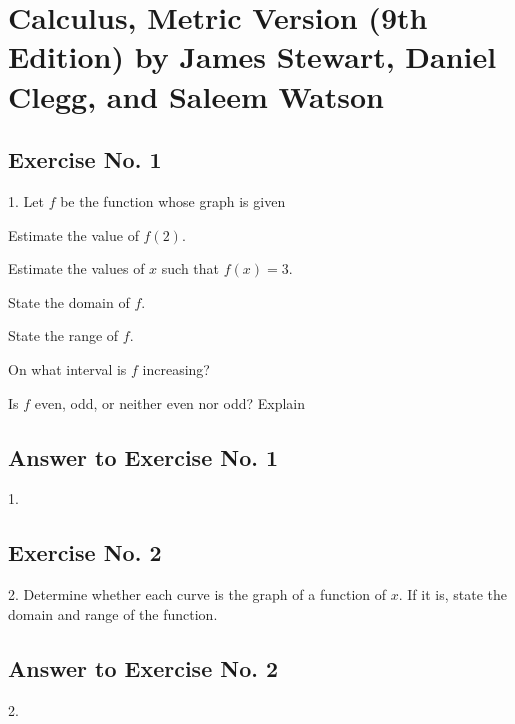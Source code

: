 \documentclass[oneside, 11pt, DIV = 10, BCOR = 0mm, headsepline = 0.8pt, footsepline = 0.4pt, numbers = noenddot, headings = openany]{scrbook}
\date{}
\title{}
\begin{document}
\onehalfspacing
\recalctypearea
\mainmatter
\part*{Calculus, Metric Version (9th Edition) by James Stewart, Daniel Clegg, and Saleem Watson}
\label{sec:orgad5dfad}
\chapter*{Exercise No. 1}
\label{sec:orgf73563b}
\begin{EnumerateQuestions}
\item[1.] Let \(f\) be the function whose graph is given
  \begin{EnumerateSubquestions}
    \item Estimate the value of \(f(2)\).
    \item Estimate the values of \(x\) such that \(f(x) = 3\).
    \item State the domain of \(f\).
    \item State the range of \(f\).
    \item On what interval is \(f\) increasing?
    \item Is \(f\) even, odd, or neither even nor odd? Explain
  \end{EnumerateSubquestions}
\end{EnumerateQuestions}
\chapter*{Answer to Exercise No. 1}
\label{sec:orgf557ac2}
\begin{EnumerateQuestions}
  \item[1.]
\end{EnumerateQuestions}
\chapter*{Exercise No. 2}
\label{sec:org69b4bb9}
\begin{EnumerateQuestions}
  \item[2.] Determine whether each curve is the graph of a function of \(x\).
     If it is, state the domain and range of the function.
\end{EnumerateQuestions}
\chapter*{Answer to Exercise No. 2}
\label{sec:org71df9ef}
\begin{EnumerateQuestions}
  \item[2.]
\end{EnumerateQuestions}
\end{document}
